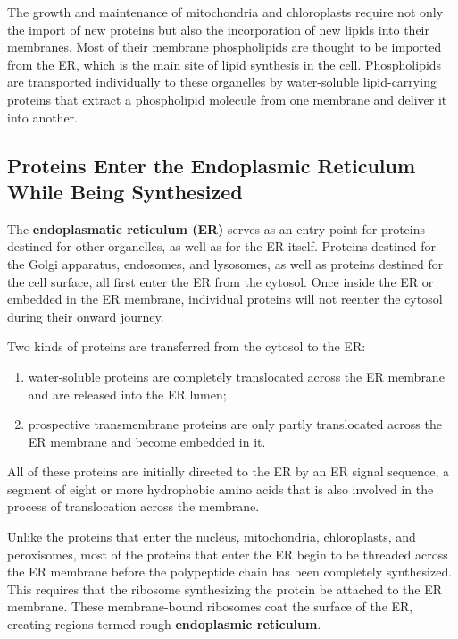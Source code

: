 The growth and maintenance of mitochondria and chloroplasts require
not only the import of new proteins but also the incorporation of new
lipids into their membranes. Most of their membrane phospholipids are
thought to be imported from the ER, which is the main site of lipid synthesis 
in the cell. Phospholipids are transported individually to these
organelles by water-soluble lipid-carrying proteins that extract a phospholipid 
molecule from one membrane and deliver it into another.

\subsection{Proteins Enter the Endoplasmic Reticulum While Being Synthesized}

The \textbf{endoplasmatic reticulum (ER)} serves as an entry point for proteins destined 
for other organelles, as well as for the ER itself. Proteins destined for the Golgi
apparatus, endosomes, and lysosomes, as well as proteins destined for
the cell surface, all first enter the ER from the cytosol. Once inside the ER
or embedded in the ER membrane, individual proteins will not reenter
the cytosol during their onward journey.

Two kinds of proteins are transferred from the cytosol to the ER: 

\begin{enumerate}
\item water-soluble proteins are completely translocated across the ER membrane
and are released into the ER lumen;
\item prospective transmembrane proteins are only partly translocated across 
the ER membrane and become embedded in it.
\end{enumerate}

All of these proteins are initially directed to the ER by an ER signal sequence,
a segment of eight or more hydrophobic amino acids
that is also involved in the process of translocation across the
membrane.

Unlike the proteins that enter the nucleus, mitochondria, chloroplasts,
and peroxisomes, most of the proteins that enter the ER begin to be
threaded across the ER membrane before the polypeptide chain has been
completely synthesized. This requires that the ribosome synthesizing
the protein be attached to the ER membrane. These membrane-bound
ribosomes coat the surface of the ER, creating regions termed rough
\textbf{endoplasmic reticulum}.

